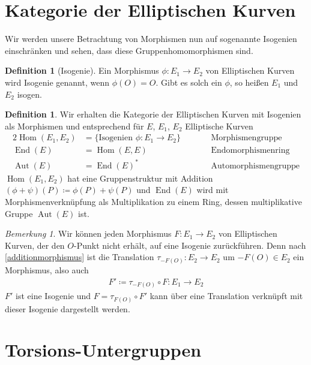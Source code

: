 \documentclass[english, german, parskip=half]{scrartcl}
\theoremstyle{definition}
\newtheorem{Definition}[Satz]{Definition}
\theoremstyle{remark}
\newtheorem{Bemerkung}[Satz]{Bemerkung}
\DeclareMathOperator{\Hom}{Hom} %
\DeclareMathOperator{\End}{End} %
\DeclareMathOperator{\Aut}{Aut} %
\begin{document}



\section{Kategorie der Elliptischen Kurven}
Wir werden unsere Betrachtung von Morphismen nun auf sogenannte
Isogenien einschränken und sehen, dass diese Gruppenhomomorphismen
sind.

\begin{Definition}[Isogenie]
  Ein Morphismus $\phi\colon E_1\to E_2$ von Elliptischen Kurven wird
  Isogenie genannt, wenn $\phi(O)=O$.
  Gibt es solch ein $\phi$, so heißen $E_1$ und $E_2$ isogen.
\end{Definition}

\begin{Definition}
  Wir erhalten die Kategorie der Elliptischen Kurven mit Isogenien als
  Morphismen und entsprechend für $E$, $E_1$, $E_2$ Elliptische Kurven
  \begin{alignat*}{2}
    \Hom(E_1, E_2)&=\{\text{Isogenien }\phi\colon E_1\to E_2\}
    \qquad&&\text{Morphismengruppe}
    \\
    \End(E)&=\Hom(E,E)
    &&\text{Endomorphismenring}\\
    \Aut(E)&=\End(E)^*
    &&\text{Automorphismengruppe} 
  \end{alignat*}
  $\Hom(E_1, E_2)$ hat eine Gruppenstruktur mit Addition
  $(\phi+\psi)(P)\coloneqq \phi(P)+\psi(P)$ 
  und $\End(E)$ wird mit Morphismenverknüpfung als Multiplikation zu 
  einem Ring, dessen multiplikative Gruppe $\Aut(E)$ ist.
\end{Definition}

\begin{Bemerkung}
Wir können jeden Morphismus $F\colon E_1\to E_2$ von Elliptischen
Kurven, der den $O$-Punkt nicht erhält, auf eine Isogenie
zurückführen.
Denn nach \autoref{additionmorphismus} ist die Translation
$\tau_{-F(O)}\colon E_2\to E_2$ um $-F(O)\in E_2$
ein Morphismus, also auch 
\begin{gather*}
  F'\coloneqq\tau_{-F(O)}\circ F\colon E_1\to E_2
\end{gather*}
$F'$ ist eine Isogenie und $F=\tau_{F(O)}\circ F'$ kann über
eine Translation verknüpft mit dieser Isogenie dargestellt werden.
\end{Bemerkung}

\section{Torsions-Untergruppen}
\end{document}
